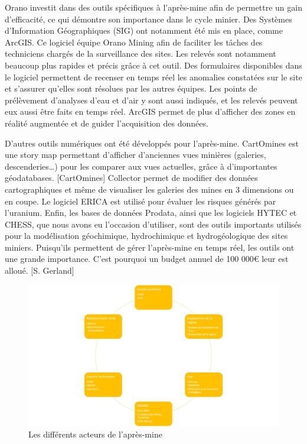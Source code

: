 \documentclass{article}
\begin{document}
Orano investit dans des outils spécifiques à l’après-mine afin de permettre un gain d’efficacité, ce qui démontre son importance dans le cycle minier. Des Systèmes d’Information Géographiques (SIG) ont notamment été mis en place, comme ArcGIS. Ce logiciel équipe Orano Mining afin de faciliter les tâches des techniciens chargés de la surveillance des sites. Les relevés sont notamment beaucoup plus rapides et précis grâce à cet outil. Des formulaires disponibles dans le logiciel permettent de recenser en temps réel les anomalies constatées sur le site et s’assurer qu’elles sont résolues par les autres équipes. Les points de prélèvement d’analyses d’eau et d’air y sont aussi indiqués, et les relevés peuvent eux aussi être faits en temps réel. ArcGIS permet de plus d’afficher des zones en réalité augmentée et de guider l’acquisition des données. 

D’autres outils numériques ont été développés pour l’après-mine. CartOmines est une story map permettant d’afficher d’anciennes vues minières (galeries, descenderies…) pour les comparer aux vues actuelles, grâce à d’importantes géodatabases. [CartOmines] Collector permet de modifier des données cartographiques et même de visualiser les galeries des mines en 3 dimensions ou en coupe. Le logiciel ERICA est utilisé pour évaluer les risques générés par l’uranium. Enfin, les bases de données Prodata, ainsi que les logiciels HYTEC et CHESS, que nous avons eu l’occasion d’utiliser, sont des outils importants utilisés pour la modélisation géochimique, hydrochimique et hydrogéologique des sites miniers. Puisqu’ils permettent de gérer l’après-mine en temps réel, les outils ont une grande importance. C’est pourquoi un budget annuel de 100 000€ leur est alloué. [S. Gerland]


\begin{figure}[H]
    \centering
    \includegraphics[width=0.9\linewidth]{I_B_3.jpg}
    \caption{Les différents acteurs de l'après-mine}
    \label{fig:acteurs_apres_mine}
\end{figure}
\end{document}

